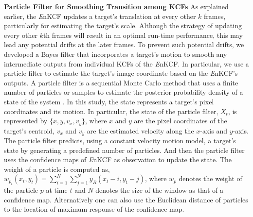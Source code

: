 \documentclass{bmvc2k}
\begin{document}
\textbf{Particle Filter for Smoothing Transition among KCFs} As
explained earlier, the {\it E}nKCF updates a target's translation at
every other $k$ frames, particularly for estimating the target's
scale. Although the strategy of updating every other $k$th frames will
result in an optimal run-time performance, this may lead any potential
drifts at the later frames. To prevent such potential drifts, we
developed a Bayes filter that incorporates a target's motion to smooth
any intermediate outputs from individual KCFs of the {\it E}nKCF. In
particular, we use a particle filter to estimate the target's image
coordinate based on the {\it E}nKCF's outputs. A particle filter is a
sequential Monte Carlo method that uses a finite number of particles
or samples to estimate the posterior probability density of a state of
the system \cite{thrun2005probabilistic}. In this study, the state
represents a target's pixel coordinates and its motion. In particular,
the state of the particle filter, $X_t$, is represented by $\lbrace x,
y, v_{x}, v_{y} \rbrace$, where $x$ and $y$ are the pixel coordinates
of the target's centroid, $v_x$ and $v_y$ are the estimated velocity
along the $x$-axis and $y$-axis. The particle filter predicts, using a
constant velocity motion model, a target's state by generating a
predefined number of particles. And then the particle filter uses the
confidence maps of {\it E}nKCF as observation to update the state. The
weight of a particle is computed as, $w_{p_{t}}(x_{t},y_{t}) =
\sum_{i=1}^{N}\sum_{j=1}^{N} y_{R}(x_{t}-i,y_{t}-j)$, where $w_{p}$
denotes the weight of the particle $p$ at time $t$ and $N$ denotes the
size of the window as that of a confidence map. Alternatively one can
also use the Euclidean distance of particles to the location of
maximum response of the confidence map.

\end{document}
